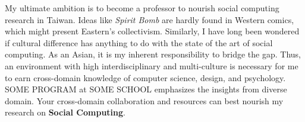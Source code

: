 %
\noindent
My ultimate ambition is to become a professor to nourish social computing research in Taiwan.
Ideas like \textit{Spirit Bomb} are hardly found in Western comics, which might present Eastern's collectivism.
Similarly, I have long been wondered if cultural difference has anything to do with the state of the art of social computing. 
As an Asian, it is my inherent responsibility to bridge the gap.
Thus, an environment with high interdisciplinary and multi-culture is necessary
for me to earn cross-domain knowledge of computer science, design, and psychology.
SOME PROGRAM at SOME SCHOOL emphasizes the insights from diverse domain. 
Your cross-domain collaboration and resources can best nourish my research on \textbf{Social Computing}.\\


